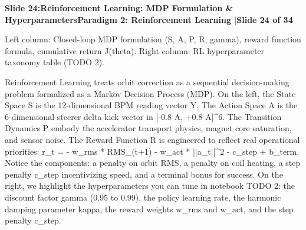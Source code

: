 \documentclass[11pt,a4paper]{article}
\begin{document}
\noindent\begin{tcolorbox}[colback=navy,colframe=navy,left=6pt,right=6pt,top=3pt,bottom=3pt,boxrule=0pt,arc=2pt]
{\large\bfseries\color{white}Slide 24:\enspace Reinforcement Learning: MDP Formulation \& Hyperparameters}\hfill{\footnotesize\bfseries\color{white!85!lightbg}Paradigm 2: Reinforcement Learning \enspace$|$\enspace Slide 24 of 34}
\end{tcolorbox}
\vspace{0.2em}
\begin{tcolorbox}[colback=lightbg,colframe=bordergray,title={\footnotesize\bfseries\color{darkgray}Slide Visual Blueprint},fontupper=\small,left=6pt,right=6pt,top=2.5pt,bottom=2.5pt,boxrule=0.6pt,arc=2.5pt]
Left column: Closed-loop MDP formulation (S, A, P, R, gamma), reward function formula, cumulative return J(theta). Right column: RL hyperparameter taxonomy table (TODO 2).
\end{tcolorbox}
\vspace{0.2em}
\begin{tcolorbox}[colback=white,colframe=primaryblue,title={\footnotesize\bfseries\color{white}Spoken Presenter Script},fontupper=\small,left=6pt,right=6pt,top=3pt,bottom=3pt,boxrule=0.8pt,arc=2.5pt]
Reinforcement Learning treats orbit correction as a sequential decision-making problem formalized as a Markov Decision Process (MDP). On the left, the State Space S is the 12-dimensional BPM reading vector Y. The Action Space A is the 6-dimensional steerer delta kick vector in [-0.8 A, +0.8 A]\textasciicircum{}6. The Transition Dynamics P embody the accelerator transport physics, magnet core saturation, and sensor noise. The Reward Function R is engineered to reflect real operational priorities: r\_t = - w\_rms * RMS\_(t+1) - w\_act * ||a\_t||\textasciicircum{}2 - c\_step + b\_term. Notice the components: a penalty on orbit RMS, a penalty on coil heating, a step penalty c\_step incentivizing speed, and a terminal bonus for success. On the right, we highlight the hyperparameters you can tune in notebook TODO 2: the discount factor gamma (0.95 to 0.99), the policy learning rate, the harmonic damping parameter kappa, the reward weights w\_rms and w\_act, and the step penalty c\_step.
\end{tcolorbox}
\vspace{0.2em}
\end{document}
